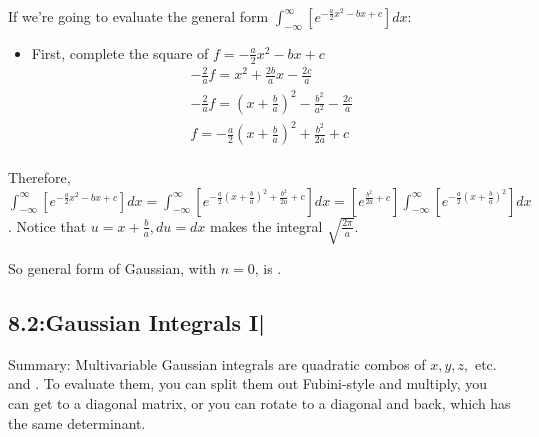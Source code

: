 \documentclass[11pt, oneside]{article}   	%
\begin{document}
If we're going to evaluate the general form $\int_{-\infty}^{\infty} [e^{-\frac{a}{2}x^2-bx+c}] dx$:
\begin{itemize}
\item First, complete the square of $f = -\frac{a}{2}x^2-bx+c$
\begin{align}
-\frac{2}{a}f =x^2+\frac{2b}{a}x-\frac{2c}{a} \\
-\frac{2}{a}f =(x+\frac{b}{a})^2-\frac{b^2}{a^2}-\frac{2c}{a} \\
f = -\frac{a}{2}(x+\frac{b}{a})^2 +\frac{b^2}{2a}+c\\
\end{align}
\end{itemize}

Therefore, $\int_{-\infty}^{\infty} [e^{-\frac{a}{2}x^2-bx+c}] dx =  \int_{-\infty}^{\infty} [e^{-\frac{a}{2}(x+\frac{b}{a})^2 +\frac{b^2}{2a}+c}]dx = [e^{\frac{b^2}{2a}+c}] \int_{-\infty}^{\infty} [e^{-\frac{a}{2}(x+\frac{b}{a})^2}] dx$.  Notice that $u = x+\frac{b}{a}, du = dx$ makes the integral $\sqrt{\frac{2\pi}{a}}$.

So general form of Gaussian, with $n=0$, is .

\subsection{8.2:Gaussian Integrals I|}

Summary: Multivariable Gaussian integrals are quadratic combos of $x, y, z,$ etc. and .  To evaluate them, you can split them out Fubini-style and multiply, you can get to a diagonal matrix, or you can rotate to a diagonal and back, which has the same determinant.
\end{document}
